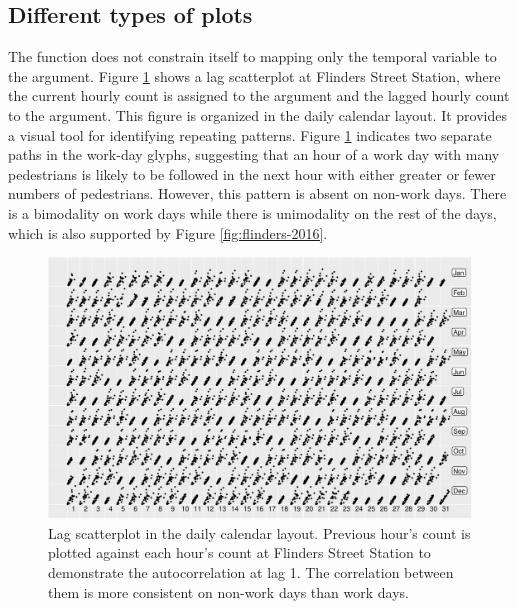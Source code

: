 \documentclass[article]{jss}
\theoremstyle{definition}
\theoremstyle{definition}
\theoremstyle{remark}
\begin{document}
\subsection{Different types of plots}\label{different-types-of-plots}

The  function does not constrain itself to mapping
only the temporal variable to the  argument. Figure
\ref{fig:scatterplot} shows a lag scatterplot at Flinders Street
Station, where the current hourly count is assigned to the 
argument and the lagged hourly count to the  argument. This
figure is organized in the daily calendar layout. It provides a visual
tool for identifying repeating patterns. Figure \ref{fig:scatterplot}
indicates two separate paths in the work-day glyphs, suggesting that an
hour of a work day with many pedestrians is likely to be followed in the
next hour with either greater or fewer numbers of pedestrians. However,
this pattern is absent on non-work days. There is a bimodality on work
days while there is unimodality on the rest of the days, which is also
supported by Figure \ref{fig:flinders-2016}.

\begin{CodeChunk}
\begin{figure}

{\centering \includegraphics[width=\textwidth]{figure/scatterplot-1} 

}

\caption[Lag scatterplot in the daily calendar layout.
Previous hour's count is plotted against each hour's count at Flinders
Street Station to demonstrate the autocorrelation at lag 1. The
correlation between them is more consistent on non-work days than work
days.]{Lag scatterplot in the daily calendar layout.
Previous hour's count is plotted against each hour's count at Flinders
Street Station to demonstrate the autocorrelation at lag 1. The
correlation between them is more consistent on non-work days than work
days.}\label{fig:scatterplot}
\end{figure}
\end{CodeChunk}
\end{document}
